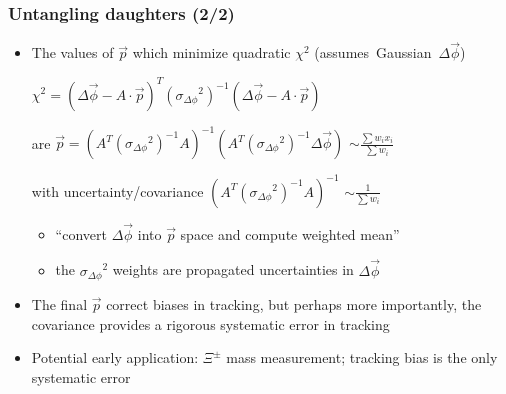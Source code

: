 \documentclass[compress]{beamer}
\begin{document}
\begin{frame}
\frametitle{Untangling daughters (2/2)}
\begin{itemize}\setlength{\itemsep}{0.25 cm}
\item The values of $\vec{p}$ which minimize quadratic $\chi^2$ \mbox{(assumes Gaussian $\Delta \vec{\phi}$)\hspace{-1 cm}}
\begin{center}
$\chi^2 = \left( \Delta \vec{\phi} - A \cdot \vec{p} \right)^T \left( {\sigma_{\Delta \phi}}^2 \right)^{-1} \left( \Delta \vec{\phi} - A \cdot \vec{p} \right)$
\end{center}
are $\vec{p} = \left( A^T \left( {\sigma_{\Delta \phi}}^2 \right)^{-1} A \right)^{-1} \left( A^T \left( {\sigma_{\Delta \phi}}^2 \right)^{-1} \Delta \vec{\phi} \right)$ \hfill $\sim \frac{\sum w_i x_i}{\sum w_i}$

\vspace{0.25 cm}
with uncertainty/covariance $\left( A^T \left( {\sigma_{\Delta \phi}}^2 \right)^{-1} A \right)^{-1}$ \hfill $\sim \frac{1}{\sum w_i}$

\begin{itemize}\setlength{\itemsep}{0.1 cm}
\item ``convert $\Delta \vec{\phi}$ into $\vec{p}$ space and compute weighted mean''

\item the ${\sigma_{\Delta \phi}}^2$ weights are propagated uncertainties in $\Delta \vec{\phi}$
\end{itemize}

\item The final $\vec{p}$ correct biases in tracking, but perhaps more
  importantly, the covariance provides a rigorous systematic error in tracking

\item Potential early application: $\Xi^\pm$ mass measurement; tracking bias is the only systematic error
\end{itemize}
\end{frame}
\end{document}

